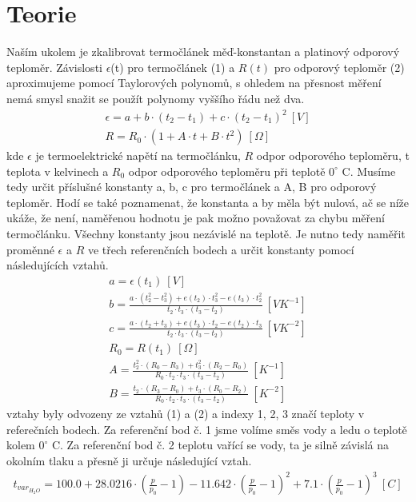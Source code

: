 \documentclass{article}
\begin{document}
\section*{Teorie}
\par Naším ukolem je zkalibrovat termočlánek měď-konstantan a platinový odporový teploměr. Závislosti $\epsilon$(t) pro termočlánek (1) a $R(t)$ pro odporový teploměr (2) aproximujeme pomocí Taylorových polynomů, s ohledem na přesnost měření nemá smysl snažit se použít polynomy vyššího řádu než dva.
\begin{align}
\epsilon = a + b\cdot(t_{2}-t_{1})+c\cdot(t_{2}-t_{1})^2\:[V]\\
R = R_{0}\cdot(1+A\cdot t+B\cdot t^2)\:[\Omega]
\end{align}
kde $\epsilon$ je termoelektrické napětí na termočlánku, $R$ odpor odporového teploměru, t teplota v kelvinech a $R_{0}$ odpor odporového teploměru při teplotě $0^{\circ}$ C. Musíme tedy určit příslušné konstanty a, b, c pro termočlánek a A, B pro odporový teploměr. Hodí se také poznamenat, že konstanta a by měla být nulová, ač se níže ukáže, že není, naměřenou hodnotu je pak možno považovat za chybu měření termočlánku. Všechny konstanty jsou nezávislé na teplotě. Je nutno tedy naměřit proměnné $\epsilon$ a $R$ ve třech referenčních bodech a určit konstanty pomocí následujících vztahů.
\begin{align}
a=\epsilon(t_{1})\:[V]\\
b=\frac{a\cdot(t_{2}^{2}-t_{3}^{2})+e(t_{2})\cdot t_{3}^{2}-e(t_{3})\cdot t_{2}^{2}}{t_{2}\cdot t_{3}\cdot(t_{3}-t_{2})}\:[VK^{-1}]\\
c=\frac{a\cdot(t_{2}+t_{3})+e(t_{3})\cdot t_{2}-e(t_{2})\cdot t_{3}}{t_{2}\cdot t_{3}\cdot(t_{3}-t_{2})}\:[VK^{-2}]\\
R_{0} = R(t_{1})\:[\Omega]\\
A =\frac{t_{2}^{2}\cdot(R_{0}-R_{3})+t_{3}^{2}\cdot(R_{2}-R_{0})}{R_{0}\cdot t_{2}\cdot t_{3}\cdot(t_{3}-t_{2})}\:[K^{-1}]\\
B =\frac{t_{2}\cdot(R_{3}-R_{0})+t_{3}\cdot(R_{0}-R_{2})}{R_{0}\cdot t_{2}\cdot t_{3}\cdot(t_{3}-t_{2})}\:[K^{-2}]
\end{align}
vztahy byly odvozeny ze vztahů (1) a (2) a indexy 1, 2, 3 značí teploty v referečních bodech. Za referenční bod č. 1 jsme volíme směs vody a ledu o teplotě kolem $0^{\circ}$ C. Za referenční bod č. 2 teplotu vařící se vody, ta je silně závislá na okolním tlaku a přesně ji určuje následující vztah.
\begin{align}
t_{var_{H_{2}O}} = 100.0 + 28.0216\cdot(\frac{p}{p_{0}}-1)-11.642\cdot(\frac{p}{p_{0}}-1)^{2}+7.1\cdot(\frac{p}{p_{0}}-1)^{3}\:[C]
\end{align}
\end{document}
